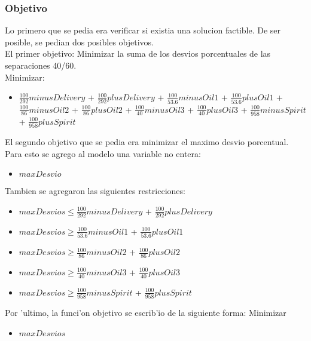 \subsubsection{Objetivo}
Lo primero que se pedia era verificar si existia una solucion factible. De ser posible, se pedian dos posibles objetivos.\\
El primer objetivo: Minimizar la suma de los desvios porcentuales de las separaciones 40/60.\\
Minimizar: 
\begin{itemize}
\item $\frac{100}{292} minusDelivery$ + $\frac{100}{292} plusDelivery$ + $\frac{100}{53.6} minusOil1$ + $\frac{100}{53.6} plusOil1$ + $\frac{100}{86} minusOil2$ + $\frac{100}{86} plusOil2$ + $\frac{100}{40} minusOil3$ + $\frac{100}{40} plusOil3$ + $\frac{100}{958} minusSpirit$ + $\frac{100}{958} plusSpirit$
\end{itemize}
El segundo objetivo que se pedia era minimizar el maximo desvio porcentual.
Para esto se agrego al modelo una variable no entera:
\begin{itemize}
\item $maxDesvio$
\end{itemize}
Tambien se agregaron las siguientes restricciones: 
\begin{itemize}
\item $maxDesvios \leq \frac{100}{292} minusDelivery$ + $\frac{100}{292} plusDelivery$
\item $maxDesvios \geq \frac{100}{53.6} minusOil1$ + $\frac{100}{53.6} plusOil1$
\item $maxDesvios \geq  \frac{100}{86} minusOil2$ + $\frac{100}{86} plusOil2$
\item $maxDesvios \geq \frac{100}{40} minusOil3$ + $\frac{100}{40} plusOil3$
\item $maxDesvios \geq \frac{100}{958} minusSpirit$ + $\frac{100}{958} plusSpirit$
\end{itemize}
Por 'ultimo, la funci'on objetivo se escrib'io de la siguiente forma:
Minimizar
 \begin{itemize}
 \item $maxDesvios$
\end{itemize}
\newpage
